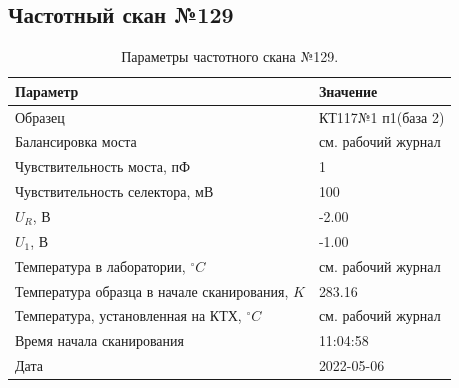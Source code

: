 \subsection{Частотный скан №129}
\begin{table}[!ht]
    \centering
    \caption{Параметры частотного скана №129.}
    \begin{tabular}{|l|l|}
        \hline
        Параметр                                       & Значение                  \\ \hline
        Образец                                        & КТ117№1 п1(база 2)        \\ \hline
        Балансировка моста                             & см. рабочий журнал        \\ \hline
        Чувствительность моста, пФ                     & 1                         \\ \hline
        Чувствительность селектора, мВ                 & 100                       \\ \hline
        $U_R$, В                                       & -2.00                     \\ \hline
        $U_1$, В                                       & -1.00                     \\ \hline
        Температура в лаборатории, $^\circ C$          & см. рабочий журнал        \\ \hline
        Температура образца в начале сканирования, $K$ & 283.16                    \\ \hline
        Температура, установленная на КТХ, $^\circ C$  & см. рабочий журнал        \\ \hline
        Время начала сканирования                      & 11:04:58                  \\ \hline
        Дата                                           & 2022-05-06                \\ \hline
    \end{tabular}
    \label{table:frequency_scan_129}
\end{table}

